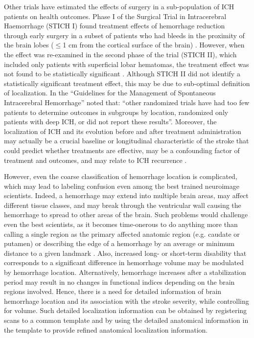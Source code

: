\documentclass[10pt]{article}\usepackage[]{graphicx}\usepackage[]{color}
\begin{document}
Other trials have estimated the effects of surgery in a sub-population of ICH patients on health outcomes. %
Phase I of the Surgical Trial in Intracerebral Haemorrhage (STICH I) found treatment effects of hemorrhage reduction through early surgery in a subset of patients who had bleeds in the proximity of the brain lobes ($≤$1 cm from the cortical surface of the brain) \citep{mendelow_early_2005}. However, when the effect was re-examined in the second phase of the trial (STICH II), which included only patients with superficial lobar hematomas, the treatment effect was not found to be statistically significant \citep{mendelow_early_2013}.  Although STICH II did not identify a statistically significant treatment effect, this may be due to sub-optimal definition of localization.  In the ``Guidelines for the Management of Spontaneous Intracerebral Hemorrhage'' \citet{morgenstern_guidelines_2010} noted that: ``other randomized trials have had too few patients to determine outcomes in subgroups by location, randomized only patients with deep ICH, or did not report these results''.  Moreover, the localization of ICH and its evolution before and after treatment administration may actually be a crucial baseline or longitudinal characteristic of the stroke that could predict whether treatments are effective, may be a confounding factor of treatment and outcomes, and may relate to ICH recurrence \citep{fitzmaurice_effect_2008}.  

However, even the coarse classification of hemorrhage location is complicated,  which may lead to labeling confusion even among the best trained neuroimage scientists. Indeed, a hemorrhage may extend into multiple brain areas, may affect different tissue classes, and may break through the ventricular wall causing the hemorrhage to spread to other areas of the brain.  Such problems would challenge even the best scientists, as it becomes time-onerous to do anything more than calling a single region as the primary affected anatomic region (e.g. caudate or putamen) or describing the edge of a hemorrhage by an average or minimum distance to a given landmark \citep{ziai_multicenter_2013}.  Also, increased long- or short-term disability that corresponds to a significant difference in hemorrhage volume may be modulated by hemorrhage location.  Alternatively, hemorrhage increases after a stabilization period may result in no changes in functional indices depending on the brain regions involved. Hence, there is a need for detailed information of brain hemorrhage location and its association with the stroke severity, while controlling for volume.  Such detailed localization information can be obtained by registering scans to a common template and by using the detailed anatomical information in the template to provide refined anatomical localization information.  
\end{document}
